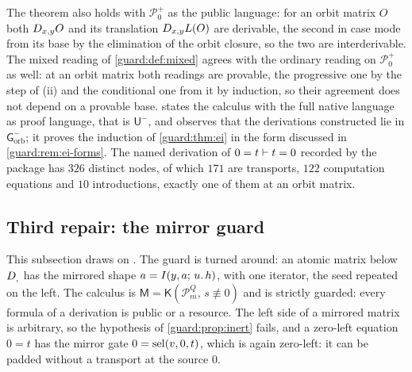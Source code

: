 \begin{remark}
\label{guard:rem:orbit-versions}
The theorem also holds with $\mathcal P_0^{+}$ as the public language: for
an orbit matrix $O$ both $D_{x,y}O$ and its translation $D_{x,y}L(O)$ are
derivable, the second in case mode from its base by the elimination of the
orbit closure, so the two are interderivable.  The mixed reading of
\cref{guard:def:mixed} agrees with the ordinary reading on
$\mathcal P_0^{+}$ as well: at an orbit matrix both readings are provable,
the progressive one by the step of (ii) and the conditional one from it by
induction, so their agreement does not depend on a provable base.
 states
the calculus with the full native language as proof language, that is
$\mathsf U^{-}$, and observes that the derivations constructed lie in
$\mathsf G^{-}_{\mathrm{orb}}$; it proves the induction of
\cref{guard:thm:ei} in the form discussed in \cref{guard:rem:ei-forms}.
The named derivation of $0=t\vdash t=0$ recorded by the package has
$326$ distinct nodes, of which $171$ are transports, $122$ computation
equations and $10$ introductions, exactly one of them at an orbit matrix.
\end{remark}

\subsection{Third repair: the mirror guard}
\label{guard:sec:mirror}

This subsection draws on .  The guard is turned around:
an atomic matrix below $D_{,}$ has the mirrored shape $a=I(y,a;\,u.\,h)$,
with one iterator, the seed repeated on the left.  The calculus is
$\mathsf M=\mathsf K(\mathcal P_m^{Q},\,s\not\equiv 0)$ and is strictly
guarded: every formula of a derivation is public or a resource.  The left
side of a mirrored matrix is arbitrary, so the hypothesis of
\cref{guard:prop:inert} fails, and a zero-left equation $0=t$ has the mirror
gate $0=\operatorname{sel}(v,0,t)$, which is again zero-left: it can be padded without a
transport at the source $0$.

